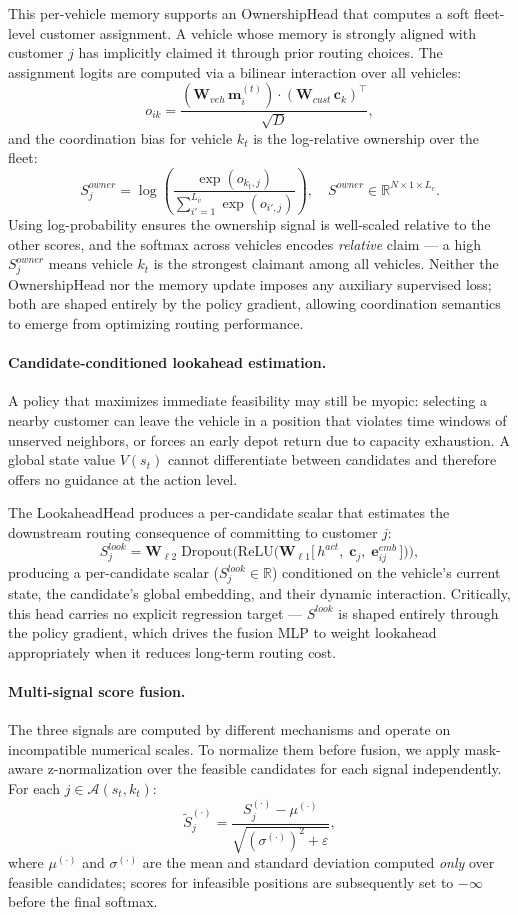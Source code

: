 This per-vehicle memory supports an OwnershipHead that computes a soft fleet-level customer assignment.
A vehicle whose memory is strongly aligned with customer $j$ has implicitly claimed it through prior routing choices.
The assignment logits are computed via a bilinear interaction over all vehicles:
\[
o_{ik} = \frac{(\mathbf{W}_{veh}\,\mathbf{m}_i^{(t)}) \cdot (\mathbf{W}_{cust}\,\mathbf{c}_k)^\top}{\sqrt{D}},
\]
and the coordination bias for vehicle $k_t$ is the log-relative ownership over the fleet:
\[
S^{owner}_j
= \log\!\left(\frac{\exp(o_{k_t,j})}{\sum_{i'=1}^{L_v}\exp(o_{i',j})}\right),
\quad S^{owner} \in \mathbb{R}^{N \times 1 \times L_c}.
\]
Using log-probability ensures the ownership signal is well-scaled relative to the other scores, and the softmax across vehicles encodes \textit{relative} claim --- a high $S^{owner}_j$ means vehicle $k_t$ is the strongest claimant among all vehicles.
Neither the OwnershipHead nor the memory update imposes any auxiliary supervised loss; both are shaped entirely by the policy gradient, allowing coordination semantics to emerge from optimizing routing performance.

\paragraph{Candidate-conditioned lookahead estimation.}
A policy that maximizes immediate feasibility may still be myopic: selecting a nearby customer can leave the vehicle in a position that violates time windows of unserved neighbors, or forces an early depot return due to capacity exhaustion.
A global state value $V(s_t)$ cannot differentiate between candidates and therefore offers no guidance at the action level.

The LookaheadHead produces a per-candidate scalar that estimates the downstream routing consequence of committing to customer $j$:
\[
S^{look}_j = \mathbf{W}_{\ell 2}\;\mathrm{Dropout}\!\bigl(\mathrm{ReLU}\bigl(\mathbf{W}_{\ell 1}
\bigl[\,h^{act},\;\mathbf{c}_j,\;\mathbf{e}_{ij}^{emb}\,\bigr]\bigr)\bigr),
\]
producing a per-candidate scalar ($S^{look}_j \in \mathbb{R}$) conditioned on the vehicle's current state, the candidate's global embedding, and their dynamic interaction.
Critically, this head carries no explicit regression target --- $S^{look}$ is shaped entirely through the policy gradient, which drives the fusion MLP to weight lookahead appropriately when it reduces long-term routing cost.

\paragraph{Multi-signal score fusion.}
The three signals are computed by different mechanisms and operate on incompatible numerical scales.
To normalize them before fusion, we apply mask-aware z-normalization over the feasible candidates for each signal independently.
For each $j \in \mathcal{A}(s_t, k_t)$:
\[
\tilde{S}^{(\cdot)}_j = \frac{S^{(\cdot)}_j - \mu^{(\cdot)}}{\sqrt{(\sigma^{(\cdot)})^2 + \varepsilon}},
\]
where $\mu^{(\cdot)}$ and $\sigma^{(\cdot)}$ are the mean and standard deviation computed \emph{only} over feasible candidates; scores for infeasible positions are subsequently set to $-\infty$ before the final softmax.


